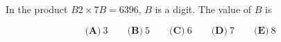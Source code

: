 

In the product $ B2 \times 7B=6396$, $ B$ is a digit. The value of $ B$ is

\[ \textbf{(A)}\ 3 \qquad
\textbf{(B)}\ 5 \qquad
\textbf{(C)}\ 6 \qquad
\textbf{(D)}\ 7 \qquad
\textbf{(E)}\ 8
\]
